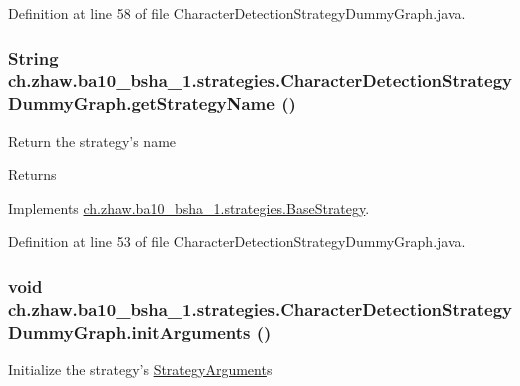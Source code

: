 Definition at line 58 of file CharacterDetectionStrategyDummyGraph.java.\hypertarget{classch_1_1zhaw_1_1ba10__bsha__1_1_1strategies_1_1CharacterDetectionStrategyDummyGraph_a8daf8f26a2d43d7b8e8e7be71e1edae5}{
\subsubsection[{getStrategyName}]{\setlength{\rightskip}{0pt plus 5cm}String ch.zhaw.ba10\_\-bsha\_\-1.strategies.CharacterDetectionStrategyDummyGraph.getStrategyName ()}}
\label{classch_1_1zhaw_1_1ba10__bsha__1_1_1strategies_1_1CharacterDetectionStrategyDummyGraph_a8daf8f26a2d43d7b8e8e7be71e1edae5}
Return the strategy's name

\begin{DoxyReturn}{Returns}

\end{DoxyReturn}


Implements \hyperlink{classch_1_1zhaw_1_1ba10__bsha__1_1_1strategies_1_1BaseStrategy_aa0ebed55eed45409bad13d43a0058780}{ch.zhaw.ba10\_\-bsha\_\-1.strategies.BaseStrategy}.

Definition at line 53 of file CharacterDetectionStrategyDummyGraph.java.\hypertarget{classch_1_1zhaw_1_1ba10__bsha__1_1_1strategies_1_1CharacterDetectionStrategyDummyGraph_a84843ef20f7ffcce6cc07b9c54ae179a}{
\subsubsection[{initArguments}]{\setlength{\rightskip}{0pt plus 5cm}void ch.zhaw.ba10\_\-bsha\_\-1.strategies.CharacterDetectionStrategyDummyGraph.initArguments ()}}
\label{classch_1_1zhaw_1_1ba10__bsha__1_1_1strategies_1_1CharacterDetectionStrategyDummyGraph_a84843ef20f7ffcce6cc07b9c54ae179a}
Initialize the strategy's \hyperlink{classch_1_1zhaw_1_1ba10__bsha__1_1_1StrategyArgument}{StrategyArgument}s 


